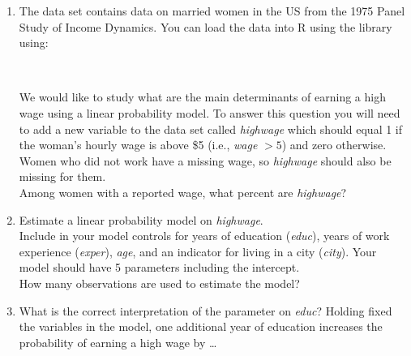 \begin{enumerate}
\item {}
The data set  contains data on married women in the US from the 1975 Panel Study of Income Dynamics. You can load the data into R using the  library using:

\medskip
{}\\
\medskip

We would like to study what are the main determinants of earning a high wage using a linear probability model. To answer this question you will need to add a new variable to the data set called \textit{highwage} which should equal 1 if the woman's hourly wage is above \$5 (i.e., \textit{wage} $>5$) and zero otherwise. Women who did not work have a missing wage, so \textit{highwage} should also be missing for them.\\
Among women with a reported wage, what percent are \textit{highwage}?

\item Estimate a linear probability model on \textit{highwage}.\\
Include in your model controls for years of education (\textit{educ}), years of work experience (\textit{exper}), \textit{age}, and an indicator for living in a city (\textit{city}). Your model should have 5 parameters including the intercept.\\
How many observations are used to estimate the model?

\item What is the correct interpretation of the parameter on \textit{educ}? Holding fixed the variables in the model, one additional year of education increases the probability of earning a high wage by \dots
{}


\end{enumerate}

